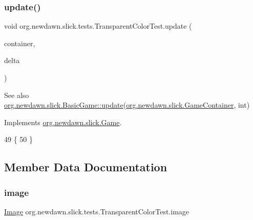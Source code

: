 \subsubsection{\texorpdfstring{update()}{update()}}
{\footnotesize\ttfamily void org.\+newdawn.\+slick.\+tests.\+Transparent\+Color\+Test.\+update (\begin{DoxyParamCaption}\item[{\mbox{\hyperlink{classorg_1_1newdawn_1_1slick_1_1_game_container}{Game\+Container}}}]{container,  }\item[{int}]{delta }\end{DoxyParamCaption})\hspace{0.3cm}{\ttfamily [inline]}}

\begin{DoxySeeAlso}{See also}
\mbox{\hyperlink{classorg_1_1newdawn_1_1slick_1_1_basic_game_acfe6fa05aef83bff1631af91a3e4bd20}{org.\+newdawn.\+slick.\+Basic\+Game\+::update}}(\mbox{\hyperlink{classorg_1_1newdawn_1_1slick_1_1_game_container}{org.\+newdawn.\+slick.\+Game\+Container}}, int) 
\end{DoxySeeAlso}


Implements \mbox{\hyperlink{interfaceorg_1_1newdawn_1_1slick_1_1_game_ab07b2e9463ee4631620dde0de25bdee8}{org.\+newdawn.\+slick.\+Game}}.


\begin{DoxyCode}
49                                                            \{
50     \}
\end{DoxyCode}


\subsection{Member Data Documentation}
\mbox{\label{classorg_1_1newdawn_1_1slick_1_1tests_1_1_transparent_color_test_a4604f1b98ff0397381e1a18b3f50ec9d}} 
\subsubsection{\texorpdfstring{image}{image}}
{\footnotesize\ttfamily \mbox{\hyperlink{classorg_1_1newdawn_1_1slick_1_1_image}{Image}} org.\+newdawn.\+slick.\+tests.\+Transparent\+Color\+Test.\+image\hspace{0.3cm}{\ttfamily [private]}}

